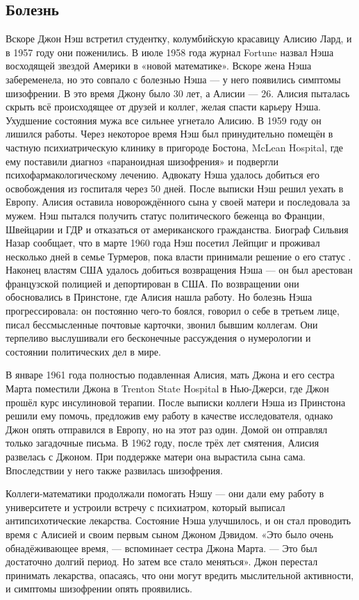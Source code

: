 \documentclass[14pt, a4paper]{extarticle}
\begin{document}
\subsection{Болезнь}
Вскоре Джон Нэш встретил студентку, колумбийскую красавицу Алисию Лард, и в
1957 году они поженились. В июле 1958 года журнал Fortune назвал Нэша
восходящей звездой Америки в «новой математике». Вскоре жена Нэша забеременела,
но это совпало с болезнью Нэша — у него появились симптомы шизофрении. В это
время Джону было 30 лет, а Алисии — 26. Алисия пыталась скрыть всё происходящее
от друзей и коллег, желая спасти карьеру Нэша. Ухудшение состояния мужа все
сильнее угнетало Алисию. В 1959 году он лишился работы. Через некоторое время
Нэш был принудительно помещён в частную психиатрическую клинику в пригороде
Бостона, McLean Hospital, где ему поставили диагноз «параноидная шизофрения» и
подвергли психофармакологическому лечению. Адвокату Нэша удалось добиться его
освобождения из госпиталя через 50 дней. После выписки Нэш решил уехать в
Европу. Алисия оставила новорождённого сына у своей матери и последовала за
мужем. Нэш пытался получить статус политического беженца во Франции,
Швейцарии и ГДР и отказаться от американского гражданства. Биограф Сильвия
Назар сообщает, что в марте 1960 года Нэш посетил Лейпциг и проживал
несколько дней в семье Турмеров, пока власти принимали решение о его статус
. Наконец властям США удалось добиться возвращения Нэша — он был арестован
французской полицией и депортирован в США. По возвращении они обосновались
в Принстоне, где Алисия нашла работу. Но болезнь Нэша прогрессировала: он
постоянно чего-то боялся, говорил о себе в третьем лице, писал бессмысленные
почтовые карточки, звонил бывшим коллегам. Они терпеливо выслушивали его
бесконечные рассуждения о нумерологии и состоянии политических дел в мире.

В январе 1961 года полностью подавленная Алисия, мать Джона и его сестра Марта
поместили Джона в Trenton State Hospital в Нью-Джерси, где Джон прошёл курс
инсулиновой терапии. После выписки коллеги Нэша из Принстона решили ему помочь,
предложив ему работу в качестве исследователя, однако Джон опять
отправился в Европу, но на этот раз один. Домой он отправлял только загадочные
письма. В 1962 году, после трёх лет смятения, Алисия развелась с Джоном. При
поддержке матери она вырастила сына сама. Впоследствии у него также
развилась шизофрения.

Коллеги-математики продолжали помогать Нэшу — они дали ему работу в
университете и устроили встречу с психиатром, который выписал антипсихотические
лекарства. Состояние Нэша улучшилось, и он стал проводить время с Алисией и
своим первым сыном Джоном Дэвидом. «Это было очень обнадёживающее время, —
вспоминает сестра Джона Марта. — Это был достаточно долгий период. Но затем
все стало меняться». Джон перестал принимать лекарства, опасаясь, что они могут
вредить мыслительной активности, и симптомы шизофрении опять проявились.
\end{document}
